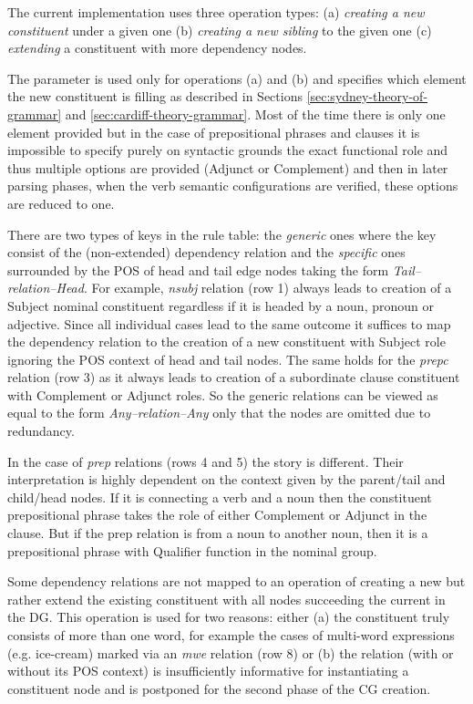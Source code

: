     The current implementation uses three operation types: (a) \textit{creating a new constituent} under a given  one (b) \textit{creating a new sibling} to the given one (c) \textit{extending} a constituent with more dependency nodes. 

    The parameter is used only for operations (a) and (b) and specifies which element the new constituent is filling as described in Sections \ref{sec:sydney-theory-of-grammar} and \ref{sec:cardiff-theory-grammar}. Most of the time there is only one element provided but in the case of prepositional phrases and clauses it is impossible to specify purely on syntactic grounds the exact functional role and thus multiple options are provided (Adjunct or Complement) and then in later parsing phases, when the verb semantic configurations are verified, these options are reduced to one.  

    There are two types of keys in the rule table: the \textit{generic} ones where the key consist of the (non-extended) dependency relation and the \textit{specific} ones surrounded by the POS of head and tail edge nodes taking the form \mbox{\textit{Tail--relation--Head}}. For example, \textit{nsubj} relation (row 1) always leads to creation of a Subject nominal constituent regardless if it is headed by a noun, pronoun or adjective. Since all individual cases lead to the same outcome it suffices to map the dependency relation to the creation of a new constituent with Subject role ignoring the POS context of head and tail nodes. The same holds for the \textit{prepc} relation (row 3) as it always leads to creation of a subordinate clause constituent with Complement or Adjunct roles. So the generic relations can be viewed as equal to the form \mbox{\textit{Any--relation--Any}} only that the nodes are omitted due to redundancy.

    In the case of \textit{prep} relations (rows 4 and 5) the story is different. Their interpretation is highly dependent on the context given by the parent/tail and child/head nodes. If it is connecting a verb and a noun then the constituent prepositional phrase takes the role of either Complement or Adjunct in the clause. But if the prep relation is from a noun to another noun, then it is a prepositional phrase with Qualifier function in the nominal group.

    Some dependency relations are not mapped to an operation of creating a new but rather extend the existing constituent with all nodes succeeding the current in the DG. This operation is used for two reasons: either (a) the constituent truly consists of more than one word, for example the cases of multi-word expressions (e.g. ice-cream) marked via an \textit{mwe} relation (row 8) or (b) the relation (with or without its POS context) is insufficiently informative for instantiating a constituent node and is postponed for the second phase of the CG creation.

